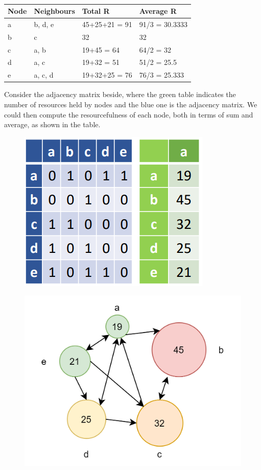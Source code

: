 \documentclass[
  notitlepage,
  onecolumn,
  openany]{book}
\begin{document}
\begin{table}[]
\centering
\begin{tabular}{@{}llll@{}}
\toprule
\textbf{Node} & \textbf{Neighbours} & \textbf{Total R} & \textbf{Average R} \\ \midrule
a             & b, d, e             & 45+25+21 = 91    & 91/3 = 30.3333     \\
b             & c                   & 32               & 32                 \\
c             & a, b                & 19+45 = 64       & 64/2 = 32          \\
d             & a, c                & 19+32 = 51       & 51/2 = 25.5        \\
e             & a, c, d             & 19+32+25 = 76    & 76/3 = 25.333      \\ \bottomrule
\end{tabular}
\caption{}
\label{tab:my-table}
\end{table}

Consider the adjacency matrix beside, where the green table indicates the number of resources held by nodes and the blue one is the adjacency matrix. We could then compute the resourcefulness of each node, both in terms of sum and average, as shown in the table.

\begin{figure}[h!]

{\centering \includegraphics[width=0.3\linewidth]{images/06-Attributes based measures/Untitled 1} 

}

\end{figure}

\begin{figure}[h!]

{\centering \includegraphics[width=0.5\linewidth]{images/06-Attributes based measures/08-graph} 

}

\end{figure}
\end{document}
